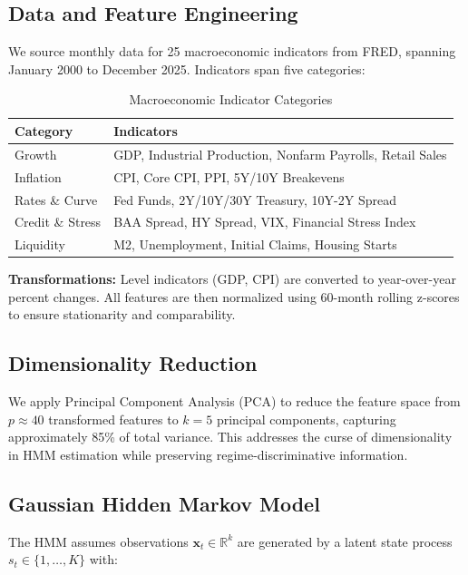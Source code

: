 \documentclass[12pt, a4paper]{article}
\begin{document}
\subsection{Data and Feature Engineering}

We source monthly data for 25 macroeconomic indicators from FRED, spanning
January 2000 to December 2025. Indicators span five categories:

\begin{table}[H]
\centering
\caption{Macroeconomic Indicator Categories}
\begin{tabular}{ll}
\toprule
\textbf{Category} & \textbf{Indicators} \\
\midrule
Growth & GDP, Industrial Production, Nonfarm Payrolls, Retail Sales \\
Inflation & CPI, Core CPI, PPI, 5Y/10Y Breakevens \\
Rates \& Curve & Fed Funds, 2Y/10Y/30Y Treasury, 10Y-2Y Spread \\
Credit \& Stress & BAA Spread, HY Spread, VIX, Financial Stress Index \\
Liquidity & M2, Unemployment, Initial Claims, Housing Starts \\
\bottomrule
\end{tabular}
\end{table}

\textbf{Transformations:} Level indicators (GDP, CPI) are converted to
year-over-year percent changes. All features are then normalized using 60-month
rolling z-scores to ensure stationarity and comparability.

\subsection{Dimensionality Reduction}

We apply Principal Component Analysis (PCA) to reduce the feature space from
$p \approx 40$ transformed features to $k = 5$ principal components, capturing
approximately 85\% of total variance. This addresses the curse of dimensionality
in HMM estimation while preserving regime-discriminative information.

\subsection{Gaussian Hidden Markov Model}

The HMM assumes observations $\mathbf{x}_t \in \mathbb{R}^k$ are generated by
a latent state process $s_t \in \{1, \ldots, K\}$ with:
\end{document}
